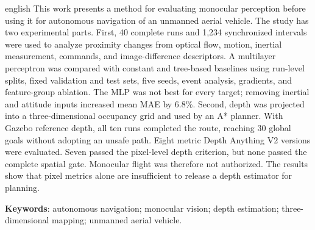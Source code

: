 \begin{resumo}[Abstract]
\begin{otherlanguage*}{english}
This work presents a method for evaluating monocular perception before using it for autonomous navigation of an unmanned aerial vehicle. The study has two experimental parts. First, 40 complete runs and 1,234 synchronized intervals were used to analyze proximity changes from optical flow, motion, inertial measurement, commands, and image-difference descriptors. A multilayer perceptron was compared with constant and tree-based baselines using run-level splits, fixed validation and test sets, five seeds, event analysis, gradients, and feature-group ablation. The MLP was not best for every target; removing inertial and attitude inputs increased mean MAE by 6.8\%. Second, depth was projected into a three-dimensional occupancy grid and used by an A* planner. With Gazebo reference depth, all ten runs completed the route, reaching 30 global goals without adopting an unsafe path. Eight metric Depth Anything V2 versions were evaluated. Seven passed the pixel-level depth criterion, but none passed the complete spatial gate. Monocular flight was therefore not authorized. The results show that pixel metrics alone are insufficient to release a depth estimator for planning.

\vspace{\onelineskip}

\noindent
\textbf{Keywords}: autonomous navigation; monocular vision; depth estimation; three-dimensional mapping; unmanned aerial vehicle.
\end{otherlanguage*}
\end{resumo}
